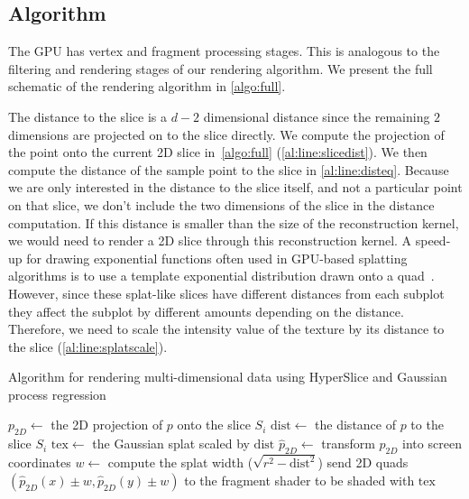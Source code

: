 \subsection{Algorithm}
\label{sec:algorithm}

The GPU has vertex and fragment processing stages.  This is analogous
to the filtering and rendering stages of our rendering algorithm.
We present the full schematic of the rendering algorithm in \autoref{algo:full}.

The distance to the slice is a $d-2$ dimensional distance since the remaining
$2$ dimensions are projected on to the slice directly.
We compute the projection of the point onto the current 2D 
slice in~\autoref{algo:full} (\autoref{al:line:slicedist}).
We then compute the distance of the sample point to the slice in 
\autoref{al:line:disteq}.
Because we are only interested in the distance to the slice itself, and not
a particular point on that slice, we don't include the two dimensions
of the slice in the distance computation.  
If this distance is smaller
than the size of the reconstruction kernel, we would need to render a
2D slice through this reconstruction kernel. 
A speed-up for drawing exponential functions often used
in GPU-based splatting algorithms is to use a template exponential distribution
drawn onto a quad~\cite{Mueller:1998}.
However, since these splat-like slices have different distances from each subplot they affect
the subplot by different amounts depending on the distance.  Therefore, we 
need to scale the intensity
value of the texture by its distance to the 
slice (\autoref{al:line:splatscale}).

\begin{algorithm}
  \caption{Algorithm for rendering multi-dimensional data using HyperSlice and Gaussian process regression}
  \label{algo:full}
  \begin{algorithmic}
   
      \State $p_{2D} \gets$ the 2D projection of $p$ onto the slice $S_i$\label{al:line:slicedist}\;
      \State $\mathrm{dist} \gets$ the distance of $p$ to the slice $S_i$\label{al:line:disteq}\;
        \label{al:line:filterif}
        \State $\mathrm{tex} \gets$ the Gaussian splat scaled by $\mathrm{dist}$\label{al:line:splatscale}\;
        \State $\hat{p}_{2D} \gets$ transform $p_{2D}$ into screen coordinates\label{al:line:screenpoint}\;
        \State $w \gets$ compute the splat width ($\sqrt{r^2-\mathrm{dist}^2}$)\label{al:line:splatsize}\;
        \State send 2D quads $(\hat{p}_{2D}(x) \pm w, \hat{p}_{2D}(y) \pm w)$ to the 
          fragment shader to be shaded with $\mathrm{tex}$\;
      \EndIf
    \EndFor
  \EndFor
  \end{algorithmic}
\end{algorithm}

